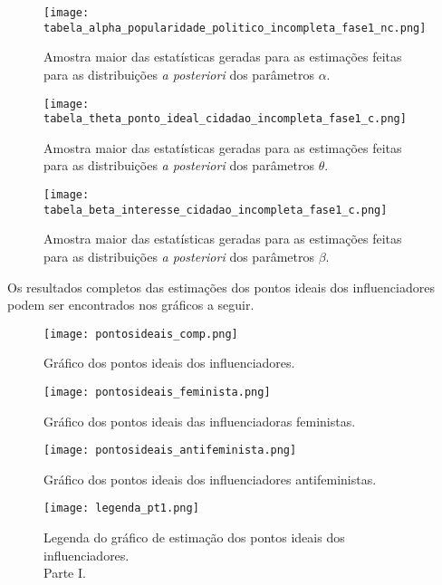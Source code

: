 \documentclass[
	12pt,				%
	openright,			%
	twoside,			%
	a4paper,			%
	english,			%
	brazil				%
	]{abntex2}
\begin{document}
\begin{anexosenv}
 \begin{figure}[!htbp]
    \centering
    \texttt{[image: tabela\_alpha\_popularidade\_politico\_incompleta\_fase1\_nc.png]}
    \caption{Amostra maior das estatísticas geradas para as estimações feitas para as distribuições \textit{a posteriori} dos parâmetros $\alpha$.}
    \label{convalphaanexo}
 \end{figure}

 \begin{figure}[!htbp]
    \centering
    \texttt{[image: tabela\_theta\_ponto\_ideal\_cidadao\_incompleta\_fase1\_c.png]}
    \caption{Amostra maior das estatísticas geradas para as estimações feitas para as distribuições \textit{a posteriori} dos parâmetros $\theta$.}
    \label{convthetaanexo}
 \end{figure}

 \begin{figure}[!htbp]
    \centering
    \texttt{[image: tabela\_beta\_interesse\_cidadao\_incompleta\_fase1\_c.png]}
    \caption{Amostra maior das estatísticas geradas para as estimações feitas para as distribuições \textit{a posteriori} dos parâmetros $\beta$.}
    \label{convbetaanexo}
 \end{figure}
 
 Os resultados completos das estimações dos pontos ideais dos influenciadores podem ser encontrados nos gráficos a seguir.
 
 \begin{sidewaysfigure}[ht]
    \texttt{[image: pontosideais\_comp.png]}
    \caption{Gráfico dos pontos ideais dos influenciadores.}
    \label{pontosideaistodos}
 \end{sidewaysfigure}
 
 \begin{sidewaysfigure}[ht]
    \texttt{[image: pontosideais\_feminista.png]}
    \caption{Gráfico dos pontos ideais das influenciadoras feministas.}
    \label{pontosideaisfem}
 \end{sidewaysfigure}
 
 \begin{sidewaysfigure}[ht]
    \texttt{[image: pontosideais\_antifeminista.png]}
    \caption{Gráfico dos pontos ideais dos influenciadores antifeministas.}
    \label{pontosideaisantifem}
 \end{sidewaysfigure}

 \begin{figure}[!htbp]
    \centering
    \texttt{[image: legenda\_pt1.png]}
    \caption{Legenda do gráfico de estimação dos pontos ideais dos influenciadores.\\ Parte I.}
    \label{leg1}
 \end{figure}


\end{anexosenv}
\end{document}
